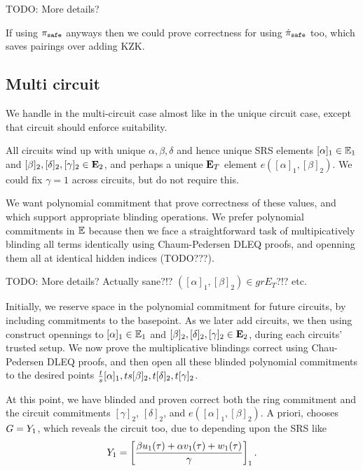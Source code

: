 TODO: More details?

If using $\pi_{\mathtt{safe}}$ anyways then we could prove correctness for \comring
using $\dot{\pi}_{\mathtt{safe}}$ too, which saves pairings over adding KZK.

\subsection{Multi circuit}

We handle \comring in the multi-circuit case almost like in the
unique circuit case, except that circuit should enforce \comring
suitability. 

All circuits wind up with unique $\alpha,\beta,\delta$ and
hence unique SRS elements $[\alpha]_1 \in {\mathbb{E}}_1$ and
 $[\beta]_2, [\delta]_2, [\gamma]_2 \in {\mathbf{E}}_2$,
and perhaps a unique ${\mathbf{E}}_T$ element $e([\alpha]_1, [\beta]_2)$.
We could fix $\gamma=1$ across circuits, but do not require this.

We want polynomial commitment \cite{KZG} that prove correctness
of these values, and which support appropriate blinding operations. 
We prefer polynomial commitments in ${\mathbb{E}}$ because then
we face a straightforward task of multipicatively blinding
all terms identically using Chaum-Pedersen DLEQ proofs,
and openning them all at identical hidden indices (TODO???).

TODO: More details?  Actually sane?!?  $([\alpha]_1, [\beta]_2) \in grE_T$?!?  etc.

Initially, we reserve space in the polynomial commitment for future
circuits, by including commitments to the basepoint.
As we later add circuits, we then using \cite{aSVC} construct opennings to
$[\alpha]_1 \in {\mathbb{E}}_1$ and $[\beta]_2, [\delta]_2, [\gamma]_2 \in {\mathbf{E}}_2$,
 during each circuits' trusted setup.
We now prove the multiplicative blindings correct using Chau-Pedersen
DLEQ proofs, and then open all these blinded polynomial commitments
to the desired points
 ${t \over s} [\alpha]_1, t s [\beta]_2, t [\delta]_2, t [\gamma]_2$.


At this point, we have blinded and proven correct both the
ring commitment \comring and the circuit commitments $[\gamma]_2$,
$[\delta]_2$, and $e([\alpha]_1, [\beta]_2)$.
A priori, \pifast chooses $G = Y_1$, which reveals the circuit too,
due to depending upon the SRS like
$$ Y_1 = \left[ {\beta u_1(\tau) + \alpha v_1(\tau) + w_1(\tau) \over \gamma} \right]_1 . $$


